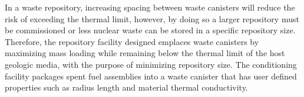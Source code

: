 \documentclass{anstrans}
\begin{document}
In a waste repository, increasing spacing between waste canisters will reduce 
the risk of exceeding the thermal limit, however, by doing so a larger 
repository must be commissioned or less nuclear waste can be stored in a 
specific repository size. 
Therefore, the repository facility designed emplaces waste canisters by 
maximizing mass loading while remaining below the thermal limit of the 
host geologic media, with the purpose of minimizing repository size. 
The conditioning facility packages spent fuel assemblies into a waste canister 
that has user defined properties such as radius length and material thermal 
conductivity. 








\end{document}
